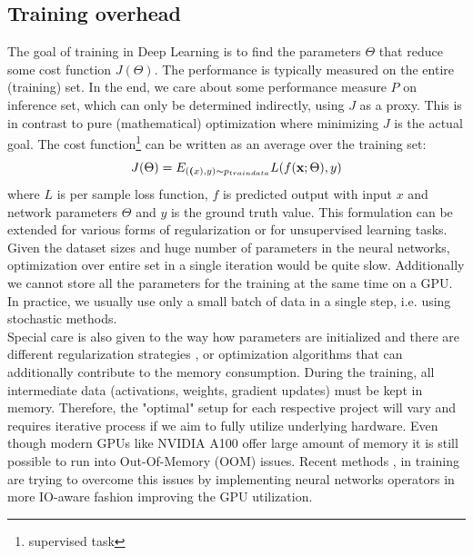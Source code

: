 \documentclass{article}
\begin{document}
\subsection{Training overhead}
The goal of training in Deep Learning is to find the parameters \textbf{$\Theta$} that reduce some cost function \textbf{$J(\Theta)$}. The performance is typically measured on the entire (training) set.
In the end, we care about some performance measure $P$ on inference set, which can only be determined indirectly, using $J$ as a proxy. This is in contrast to pure (mathematical) optimization where minimizing $J$ is the actual goal. 
The cost function\footnote{supervised task} can be written \cite{Goodfellow2016} as an average over the training set:
\begin{equation}
    J(\Theta) = E_{(\textbf(x), y) \sim p_{traindata}}L(f(\textbf{x}; \Theta), y)
\end{equation}
where $L$ is per sample loss function, $f$ is predicted output with input $x$ and network parameters $\Theta$ and $y$ is the ground truth value. 
This formulation can be extended for various forms of regularization or for unsupervised learning tasks. \\
Given the dataset sizes and huge number of parameters in the neural networks, optimization over entire set in a single iteration would be quite slow. Additionally we cannot store all the parameters for the training at the same time on a GPU. In practice, we usually use only a small batch of data in a single step, i.e. using stochastic methods. \\
Special care is also given to the way how parameters are initialized \cite{Glorot2010} and there are different regularization strategies \cite{Ioffe2015}, \cite{Srivastava2014} or optimization algorithms \cite{Kingma2017} that can additionally contribute to the memory consumption.
During the training, all intermediate data (activations, weights, gradient updates) must be kept in memory.
Therefore, the "optimal" setup for each respective project will vary and requires iterative process if we aim to fully utilize underlying hardware. Even though modern GPUs like NVIDIA A100
offer large amount of memory it is still possible to run into Out-Of-Memory (OOM) issues.
Recent methods \cite{Dao2022}, \cite{Dao2023} in training are trying to overcome this issues by implementing neural networks operators in more IO-aware fashion improving the GPU utilization.
\end{document}
